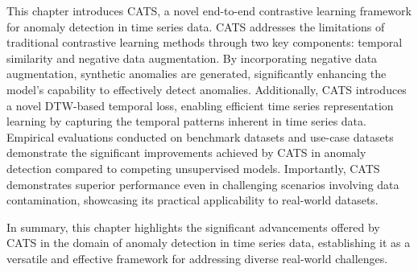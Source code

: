 This chapter introduces CATS,  a novel end-to-end contrastive learning framework for anomaly detection in time series data. CATS addresses the limitations of traditional contrastive learning methods through two key components: temporal similarity and negative data augmentation. By incorporating negative data augmentation, synthetic anomalies are generated, significantly enhancing the model's capability to effectively detect anomalies.
Additionally, CATS introduces a novel DTW-based temporal loss, enabling efficient time series representation learning by capturing the temporal patterns inherent in time series data. Empirical evaluations conducted on benchmark datasets and use-case datasets demonstrate the significant improvements achieved by CATS in anomaly detection compared to competing unsupervised models. Importantly, CATS demonstrates superior performance even in challenging scenarios involving data contamination, showcasing its practical applicability to real-world datasets.

In summary, this chapter highlights the significant advancements offered by CATS in the domain of anomaly detection in time series data, establishing it as a versatile and effective framework for addressing diverse real-world challenges.


